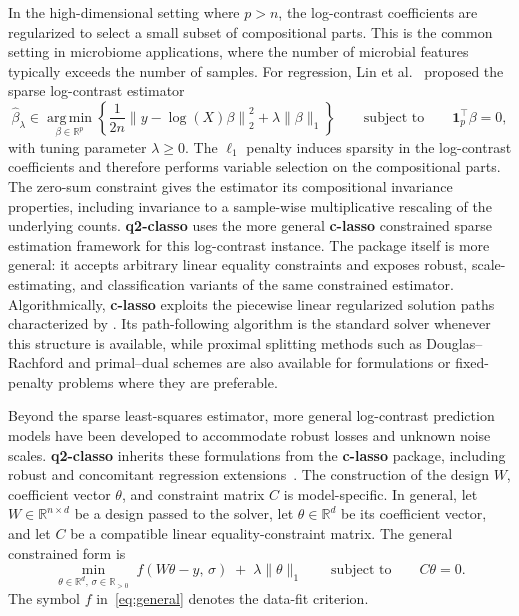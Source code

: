 \documentclass[11pt,a4paper]{article}
\newcommand{\pkg}[1]{\textbf{#1}}
\newcommand{\R}{\mathbb{R}}
\newcommand{\bbeta}{\beta}
\newcommand{\one}{\mathbf{1}}
\begin{document}
In the high-dimensional setting where $p>n$, the log-contrast coefficients are
regularized to select a small subset of compositional parts. This is the common
setting in microbiome applications, where the number of microbial features
typically exceeds the number of samples. For regression, Lin et
al.~\citeyearpar{lin2014variable} proposed the sparse log-contrast estimator
\begin{equation}
\label{eq:sparse-logcontrast}
\widehat{\bbeta}_{\lambda}
\in \operatorname*{arg\,min}_{\bbeta\in\R^p}
\left\{
\frac{1}{2n}\left\|y-\log(X)\bbeta\right\|_2^2
+ \lambda\|\bbeta\|_1
\right\}
\qquad \text{subject to} \qquad \one_p^\top\bbeta=0 ,
\end{equation}
with tuning parameter $\lambda\ge 0$. The $\ell_1$ penalty induces sparsity in
the log-contrast coefficients and therefore performs variable selection on the
compositional parts. The zero-sum constraint gives the estimator its
compositional invariance properties, including invariance to a sample-wise
multiplicative rescaling of the underlying counts. \pkg{q2-classo} uses the
more general \pkg{c-lasso} constrained sparse estimation framework
\citep{Simpson2021} for this log-contrast instance. The package itself is more
general: it accepts arbitrary linear equality constraints and exposes robust,
scale-estimating, and classification variants of the same constrained estimator.
Algorithmically, \pkg{c-lasso} exploits the piecewise linear regularized solution
paths characterized by \citet{rosset2007piecewise}. Its path-following algorithm
is the standard solver whenever this structure is available, while proximal
splitting methods such as Douglas--Rachford and primal--dual schemes are also
available for formulations or fixed-penalty problems where they are preferable.

Beyond the sparse least-squares estimator, more general log-contrast prediction
models have been developed to accommodate robust losses and unknown noise
scales. \pkg{q2-classo} inherits these formulations from the \pkg{c-lasso}
package, including robust and concomitant regression
extensions~\citep{combettes2020perspective,combettes2021regression,
mishra2022robust}. The construction of the design $W$, coefficient vector
$\theta$, and constraint matrix $C$ is model-specific. In general, let
$W\in\R^{n\times d}$ be a design passed to the solver, let
$\theta\in\R^d$ be its coefficient vector, and let $C$ be a compatible
linear equality-constraint matrix. The general constrained form is
\begin{equation}
\label{eq:general}
\min_{\theta \in \R^{d},\, \sigma \in \R_{>0}}\;
f(W\theta - y,\, \sigma) \; + \; \lambda \lVert \theta \rVert_{1}
\qquad \text{subject to} \qquad C\theta = 0 .
\end{equation}
The symbol $f$ in~\eqref{eq:general} denotes the data-fit criterion.
\end{document}
